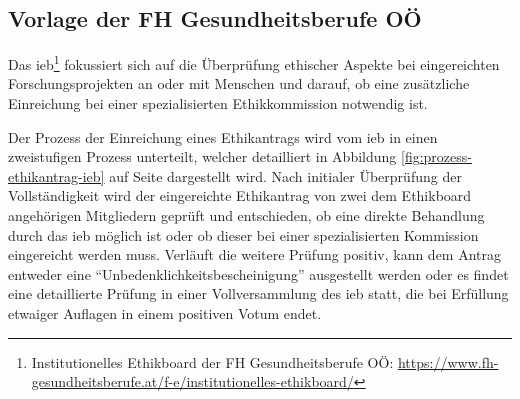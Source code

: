 \documentclass[a4paper,12pt,twoside,numbers=noendperiod]{scrreprt}
\begin{document}
\subsection{Vorlage der FH Gesundheitsberufe OÖ}
\label{sub-cec:vorlage-fh-oö}

Das \ac{ieb}\footnote{Institutionelles Ethikboard der FH Gesundheitsberufe OÖ: \url{https://www.fh-gesundheitsberufe.at/f-e/institutionelles-ethikboard/}} fokussiert sich auf die Überprüfung ethischer Aspekte bei eingereichten Forschungsprojekten an oder mit Menschen und darauf, ob eine zusätzliche Einreichung bei einer spezialisierten Ethikkommission notwendig ist. \cite{fh_gesundheitsberufe_oo_gmbh_institutionelles_2023}

\medskip

Der Prozess der Einreichung eines Ethikantrags wird vom \ac{ieb} in einen zweistufigen Prozess unterteilt, welcher detailliert in Abbildung \ref{fig:prozess-ethikantrag-ieb} auf Seite \pageref{fig:prozess-ethikantrag-ieb} dargestellt wird. Nach initialer Überprüfung der Vollständigkeit wird der eingereichte Ethikantrag von zwei dem Ethikboard angehörigen Mitgliedern geprüft und entschieden, ob eine direkte Behandlung durch das \ac{ieb} möglich ist oder ob dieser bei einer spezialisierten Kommission eingereicht werden muss. Verläuft die weitere Prüfung positiv, kann dem Antrag entweder eine \enquote{Unbedenklichkeitsbescheinigung} ausgestellt werden oder es findet eine detaillierte Prüfung in einer Vollversammlung des \ac{ieb} statt, die bei Erfüllung etwaiger Auflagen in einem positiven Votum endet. \cite{fh_gesundheitsberufe_oo_gmbh_einreichung_2023}
\end{document}
